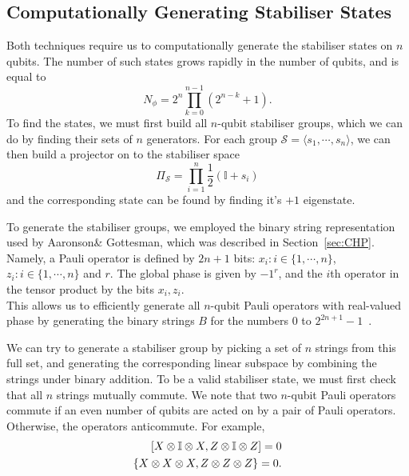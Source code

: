 \documentclass{standalone}
\begin{document}
\subsection{Computationally Generating Stabiliser States}
Both techniques require us to computationally generate the stabiliser states on $n$ qubits. The number of such states grows rapidly in the number of qubits, and is equal to~\cite{Aaronson2004a}
\begin{equation}\label{eq:nstabs}
    N_{\phi}=2^{n}\prod_{k=0}^{n-1}\left(2^{n-k}+1\right).
\end{equation}
To find the states, we must first build all $n$-qubit stabiliser groups, which we can do by finding their sets of $n$ generators. For each group $\mathcal{S}=\langle s_{1},\cdots,s_{n}\rangle$, we can then build a projector on to the stabiliser space~\cite{Gottesman1997}
\begin{equation}\label{eq:stabproj}
    \Pi_{\mathcal{S}} = \prod_{i=1}^{n} \frac{1}{2}\left(\mathbb{I}+s_{i}\right)
\end{equation}
and the corresponding state can be found by finding it's $+1$ eigenstate.
\par
To generate the stabiliser groups, we employed the binary string representation used by Aaronson\& Gottesman, which was described in Section~\ref{sec:CHP}. Namely, a Pauli operator is defined by $2n+1$ bits: $x_{i}:i\in\{1,\cdots,n\}$, $z_{i}:i\in\{1,\cdots,n\}$ and $r$. The global phase is given by $-1^{r}$, and the $i$th operator in the tensor product by the bits $x_{i},z_{i}$. \\
This allows us to efficiently generate all $n$-qubit Pauli operators with real-valued phase by generating the binary strings $B$ for the numbers $0$ to $2^{2n+1}-1$~\cite{Aaronson2004a}.\\
\par
We can try to generate a stabiliser group by picking a set of $n$ strings from this full set, and generating the corresponding linear subspace by combining the strings under binary addition. To be a valid stabiliser state, we must first check that all $n$ strings mutually commute. We note that two $n$-qubit Pauli operators commute if an even number of qubits are acted on by a pair of Pauli operators. Otherwise, the operators anticommute. For example, 
\begin{align*}
\comm{X\otimes\mathbb{I}\otimes X}{Z\otimes\mathbb{I}\otimes Z}= 0\\
\acomm{X\otimes X\otimes X}{Z\otimes Z\otimes Z} = 0. \\
\end{align*}
\end{document}
